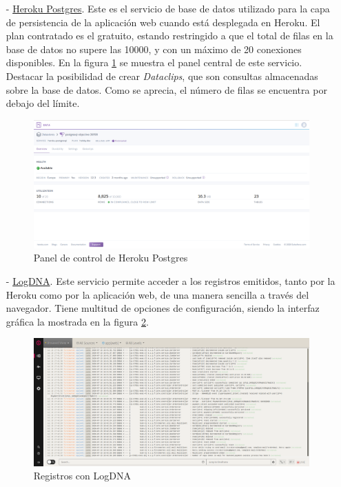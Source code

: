 \documentclass[a4paper]{article}
\begin{document}
    \begin{itemize}
       	\item[-] \href{https://elements.heroku.com/addons/heroku-postgresql}{Heroku Postgres}. Este es el servicio de base de datos utilizado para la capa de persistencia de la aplicación web cuando está desplegada en Heroku. El plan contratado es el gratuito, estando restringido a que el total de filas en la base de datos no supere las 10000, y con un máximo de 20 conexiones disponibles. En la figura \ref{fig:herokupostgres} se muestra el panel central de este servicio. Destacar la posibilidad de crear \emph{Dataclips}, que son consultas almacenadas sobre la base de datos. Como se aprecia, el número de filas se encuentra por debajo del límite.
       	
       	\begin{figure}[hbt!]
       		\centering
       		\includegraphics[width=\textwidth,keepaspectratio]{herokupostgres}
       		\caption{Panel de control de Heroku Postgres}
       		\label{fig:herokupostgres}
       	\end{figure}
       	
       	\item[-] \href{https://elements.heroku.com/addons/logdna}{LogDNA}. Este servicio permite acceder a los registros emitidos, tanto por la Heroku como por la aplicación web, de una manera sencilla a través del navegador. Tiene multitud de opciones de configuración, siendo la interfaz gráfica la mostrada en la figura \ref{fig:logdna}.
       	
       	\begin{figure}[hbt!]
       		\centering
       		\includegraphics[width=\textwidth,keepaspectratio]{logdna}
       		\caption{Registros con LogDNA}
       		\label{fig:logdna}
       	\end{figure}
       	

\end{itemize}
\end{document}
